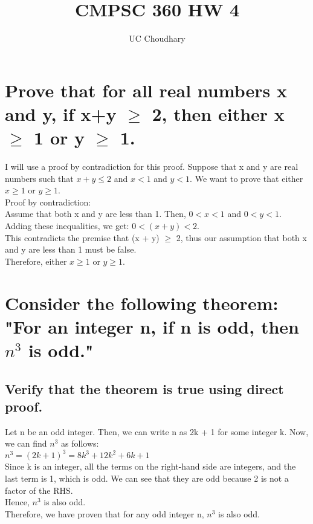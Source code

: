 \documentclass{article}
\title{CMPSC 360 HW 4}
\author{UC Choudhary}
\begin{document}
\maketitle



\section{Prove that for all real numbers x and y, if x+y $\geq$ 2, then either x $\geq$ 1 or y $\geq$ 1.}

\Large I will use a proof by contradiction for this proof.
Suppose that x and y are real numbers such that $x + y \leq 2$ and $x < 1$ and $y < 1.$ We want to prove that either $x \geq 1$ or $y \geq 1$.
\\

\Large Proof by contradiction:\\
Assume that both x and y are less than 1. Then, $0 < x < 1$ and $0 < y < 1.$ Adding these inequalities, we get:
$0 < (x + y) < 2.$\\
\Large This contradicts the premise that (x + y) $\geq$ 2, thus our assumption that both x and y are less than 1 must be false.\\
Therefore, either $x \geq 1$ or $y \geq 1.$\\


\section{Consider the following theorem: "For an integer n, if n is odd, then $n^3$ is odd."}
\subsection{Verify that the theorem is true using direct proof.}
\Large Let n be an odd integer. Then, we can write n as 2k + 1 for some integer k. Now, we can find $n^3$ as follows:\\

\Large $n^3 = (2k + 1)^3 = 8k^3 + 12k^2 + 6k + 1$\\

\Large Since k is an integer, all the terms on the right-hand side are integers, and the last term is 1, which is odd. We can see that they are odd because 2 is not a factor of the RHS.\\
\Large Hence, $n^3$ is also odd.\\

\Large Therefore, we have proven that for any odd integer n, $n^3$ is also odd.\\
\end{document}
